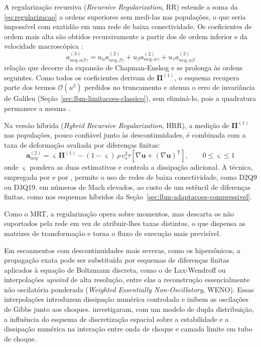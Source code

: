 A regularização recursiva (\textit{Recursive Regularization}, RR) estende a soma da \eqref{eq:regularizacao} a ordens superiores sem medi-las nas populações, o que seria impossível com exatidão em uma rede de baixa conectividade.
Os coeficientes de ordem mais alta são obtidos recursivamente a partir dos de ordem inferior e da velocidade macroscópica \parencite{Coreixas2017}:
\begin{equation}\label{eq:regularizacao-recursiva}
    a_{neq, \alpha\beta\gamma}^{(3)} = u_\alpha a_{neq, \beta\gamma}^{(2)} + u_\beta a_{neq, \alpha\gamma}^{(2)} + u_\gamma a_{neq, \alpha\beta}^{(2)}
\end{equation}
relação que decorre da expansão de Chapman-Enskog e se prolonga às ordens seguintes.
Como todos os coeficientes derivam de $\boldsymbol{\Pi}^{(1)}$, o esquema recupera parte dos termos $\mathcal{O}(u^3)$ perdidos no truncamento e atenua o erro de invariância de Galileu (Seção~\ref{sec:lbm-limitacoes-classico}), sem eliminá-lo, pois a quadratura permanece a mesma \parencite{Guo2020}.

Na versão híbrida (\textit{Hybrid Recursive Regularization}, HRR), a medição de $\boldsymbol{\Pi}^{(1)}$ nas populações, pouco confiável junto às descontinuidades, é combinada com a taxa de deformação avaliada por diferenças finitas:
\begin{equation}\label{eq:hrr}
    \mathbf{a}_{neq}^{(2)} = \varsigma\, \boldsymbol{\Pi}^{(1)} - (1 - \varsigma)\, \rho\, c_s^2 \tau \left[ \nabla \mathbf{u} + (\nabla \mathbf{u})^{\mathsf{T}} \right], \qquad 0 \le \varsigma \le 1
\end{equation}
onde $\varsigma$ pondera as duas estimativas e controla a dissipação adicional.
A técnica, empregada por \textcite{Feng2019} e por \textcite{Guo2020}, permite o uso de redes de baixa conectividade, como D2Q9 ou D3Q19, em números de Mach elevados, ao custo de um estêncil de diferenças finitas, como nos esquemas híbridos da Seção~\ref{sec:lbm-adaptacoes-compressivel}.

Como o MRT, a regularização opera sobre momentos, mas descarta os não suportados pela rede em vez de atribuir-lhes taxas distintas, o que dispensa as matrizes de transformação e torna o fluxo de execução mais previsível.

Em escoamentos com descontinuidades mais severas, como os hipersônicos, a propagação exata pode ser substituída por esquemas de diferenças finitas aplicados à equação de Boltzmann discreta, como o de Lax-Wendroff ou interpolações \textit{upwind} de alta resolução, entre elas a reconstrução essencialmente não oscilatória ponderada (\textit{Weighted Essentially Non-Oscillatory}, WENO).
Essas interpolações introduzem dissipação numérica controlada e inibem as oscilações de Gibbs junto aos choques.
\textcite{Qiu2020} investigaram, com um modelo de dupla distribuição, a influência do esquema de discretização espacial sobre a estabilidade e a dissipação numérica na interação entre onda de choque e camada limite em tubo de choque.

